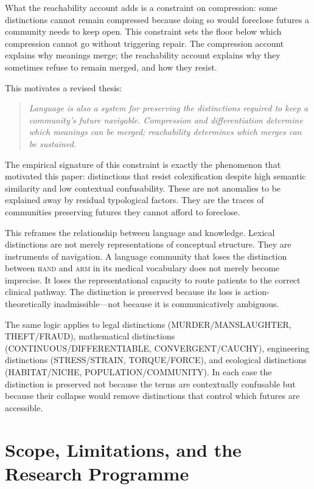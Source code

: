 \documentclass[12pt]{article}
\theoremstyle{rthm}
\theoremstyle{rdef}
\theoremstyle{remark}
\begin{document}
What the reachability account adds is a constraint on compression: some
distinctions cannot remain compressed because doing so would foreclose futures
a community needs to keep open. This constraint sets the floor below which
compression cannot go without triggering repair. The compression account explains
why meanings merge; the reachability account explains why they sometimes refuse
to remain merged, and how they resist.

This motivates a revised thesis:

\medskip
\begin{quote}
\emph{Language is also a system for preserving the distinctions required to keep
a community's future navigable. Compression and differentiation determine which
meanings can be merged; reachability determines which merges can be sustained.}
\end{quote}
\medskip

The empirical signature of this constraint is exactly the phenomenon that
motivated this paper: distinctions that resist colexification despite high
semantic similarity and low contextual confusability. These are not anomalies
to be explained away by residual typological factors. They are the traces of
communities preserving futures they cannot afford to foreclose.

This reframes the relationship between language and knowledge. Lexical
distinctions are not merely representations of conceptual structure. They are
instruments of navigation. A language community that loses the distinction
between \textsc{hand} and \textsc{arm} in its medical vocabulary does not
merely become imprecise. It loses the representational capacity to route patients
to the correct clinical pathway. The distinction is preserved because its loss
is action-theoretically inadmissible---not because it is communicatively
ambiguous.

The same logic applies to legal distinctions (MURDER/MANSLAUGHTER,
THEFT/FRAUD), mathematical distinctions (CONTINUOUS/DIFFERENTIABLE,
CONVERGENT/CAUCHY), engineering distinctions (STRESS/STRAIN,
TORQUE/FORCE), and ecological distinctions (HABITAT/NICHE,
POPULATION/COMMUNITY). In each case the distinction is preserved not because
the terms are contextually confusable but because their collapse would remove
distinctions that control which futures are accessible.

\section{Scope, Limitations, and the Research Programme}
\label{sec:programme}
\end{document}
